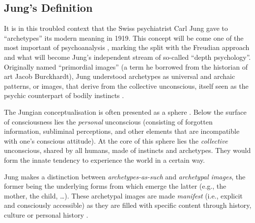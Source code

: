\documentclass[
]{book}
\begin{document}
\hypertarget{jungs-definition}{%
\subsection{Jung's Definition}\label{jungs-definition}}

It is in this troubled context that the Swiss psychiatrist Carl Jung gave to ``archetypes'' its modern meaning in 1919. This concept will be come one of the most important of psychoanalysis \citep{roesler2012archetypes}, marking the split with the Freudian approach and what will become Jung's independent stream of so-called ``depth psychology''. Originally named ``primordial images'' (a term he borrowed from the historian of art Jacob Burckhardt), Jung understood archetypes as universal and archaic patterns, or images, that derive from the collective unconscious, itself seen as the psychic counterpart of bodily instincts \citep{feist2009theories}.

The Jungian conceptualisation is often presented as a sphere \citep{cann1986jungian}. Below the surface of consciousness lies the \emph{personal} unconscious (consisting of forgotten information, subliminal perceptions, and other elements that are incompatible with one's conscious attitude). At the core of this sphere lies the \emph{collective} unconscious, shared by all humans, made of instincts and archetypes. They would form the innate tendency to experience the world in a certain way.

Jung makes a distinction between \emph{archetypes-as-such} and \emph{archetypal images}, the former being the underlying forms from which emerge the latter (e.g., the mother, the child, \ldots). These archetypal images are made \emph{manifest} (i.e., explicit and consciously accessible) as they are filled with specific content through history, culture or personal history \citep{papadopoulos2012}.
\end{document}
